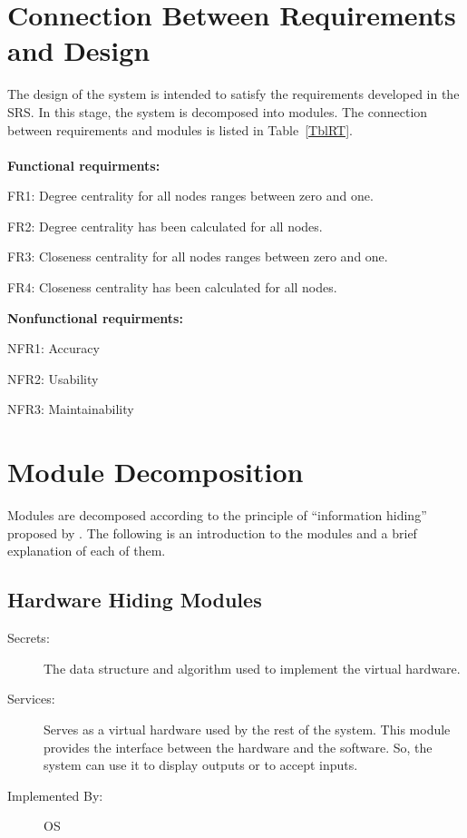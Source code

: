 \documentclass[12pt, titlepage]{article}
\begin{document}
\section{Connection Between Requirements and Design} \label{SecConnection}

The design of the system is intended to satisfy the requirements developed in
the SRS. In this stage, the system is decomposed into modules. The connection
between requirements and modules is listed in Table~\ref{TblRT}.\\\\
\textbf{Functional requirments:}
\begin{description}
\item FR1: Degree centrality for all nodes ranges between zero and one.
\item FR2: Degree centrality has been calculated for all nodes.
\item FR3: Closeness centrality for all nodes ranges between zero and one.
\item FR4: Closeness centrality has been calculated for all nodes.\\
\end{description}

\textbf{Nonfunctional requirments:}
\begin{description}
\item NFR1: Accuracy
\item NFR2: Usability
\item NFR3: Maintainability
\end{description}


\section{Module Decomposition} \label{SecMD}

Modules are decomposed according to the principle of ``information hiding''
proposed by \citet{ParnasEtAl1984}. 
The following is an introduction to the modules and a brief explanation of each of them.


\subsection{Hardware Hiding Modules }
\begin{description}
\item[Secrets:]The data structure and algorithm used to implement the virtual
  hardware.
\item[Services:]Serves as a virtual hardware used by the rest of the
 system. This module provides the interface between the hardware and the
 software. So, the system can use it to display outputs or to accept inputs.
\item[Implemented By:] OS
\end{description}
\end{document}
